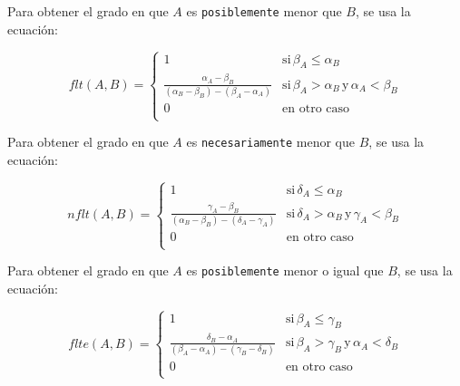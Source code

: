 \begin{definition}
Para obtener el grado en que $A$ es \texttt{posiblemente} menor que $B$, se usa la ecuación:

\begin{equation}
    flt(A,B) = \left\{ { \begin{array}{ll}
                    1 & \text{si}\, \beta_A \leq \alpha_B \\ 
                    \frac{\alpha_A - \beta_B}{(\alpha_B - \beta_B)-(\beta_A - \alpha_A)} & \text{si}\, \beta_A > \alpha_B \, \text{y} \, \alpha_A < \beta_B \\
                    0 & \text{en otro caso} \\ 
                    \end{array}  } \right.
\end{equation}
\end{definition}

\begin{definition}
Para obtener el grado en que $A$ es \texttt{necesariamente} menor que $B$, se usa la ecuación:

\begin{equation}
    nflt(A,B) = \left\{ { \begin{array}{ll}
                    1 & \text{si}\, \delta_A \leq \alpha_B \\ 
                    \frac{\gamma_A - \beta_B}{(\alpha_B - \beta_B)-(\delta_A - \gamma_A)} & \text{si}\, \delta_A > \alpha_B \, \text{y} \, \gamma_A < \beta_B \\
                    0 & \text{en otro caso} \\ 
                    \end{array}  } \right.
\end{equation}
\end{definition}

\begin{definition}
Para obtener el grado en que $A$ es \texttt{posiblemente} menor o igual que $B$, se usa la ecuación:

\begin{equation}
    flte(A,B) = \left\{ { \begin{array}{ll}
                    1 & \text{si}\, \beta_A \leq \gamma_B \\ 
                    \frac{\delta_B - \alpha_A}{(\beta_A-\alpha_A)-(\gamma_B - \delta_B)} & \text{si}\, \beta_A > \gamma_B \, \text{y} \, \alpha_A < \delta_B \\
                    0 & \text{en otro caso} \\ 
                    \end{array}  } \right.
\end{equation}
\end{definition}

